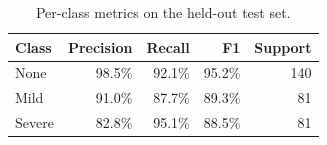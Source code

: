 \begin{table}[!t]
\centering
\caption{Per-class metrics on the held-out test set.}
\label{tab:classes}
\begin{tabular}{lrrrr}
\toprule
Class & Precision & Recall & F1 & Support \\
\midrule
None & 98.5\% & 92.1\% & 95.2\% & 140 \\
Mild & 91.0\% & 87.7\% & 89.3\% & 81 \\
Severe & 82.8\% & 95.1\% & 88.5\% & 81 \\
\bottomrule
\end{tabular}
\end{table}
